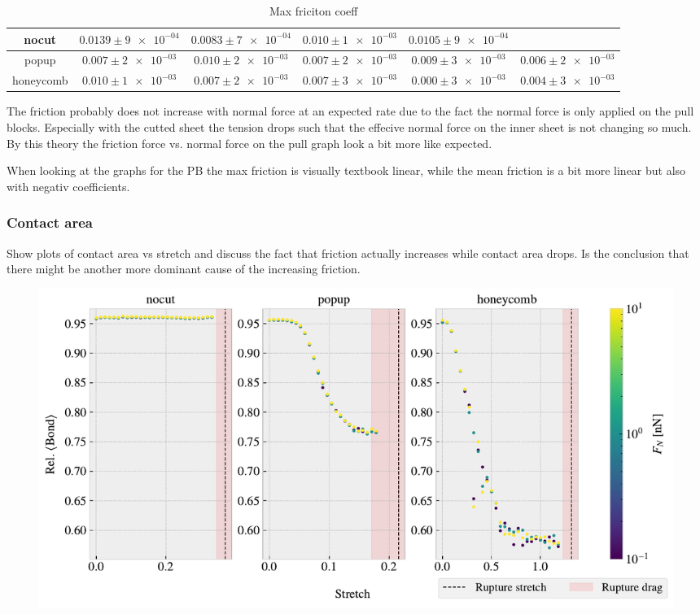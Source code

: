 \begin{table}[H]
  \begin{center}
  \caption{Max friciton coeff}
  \label{tab:fric_coeff}
  \begin{tabular}{| c | c | c | c | c | c |} \hline
    nocut & $0.0139 \pm \num{9e-04}$& $0.0083 \pm \num{7e-04}$& $0.010 \pm \num{1e-03}$& $0.0105 \pm \num{9e-04}$ &  \\ \hline
    popup & $0.007 \pm \num{2e-03}$& $0.010 \pm \num{2e-03}$& $0.007 \pm \num{2e-03}$& $0.009 \pm \num{3e-03}$& $0.006 \pm \num{2e-03}$ \\ \hline
    honeycomb & $0.010 \pm \num{1e-03}$& $0.007 \pm \num{2e-03}$& $0.007 \pm \num{3e-03}$& $0.000 \pm \num{3e-03}$& $0.004 \pm \num{3e-03}$ \\ \hline
  \end{tabular}
  \end{center}
\end{table}


The friction probably does not increase with normal force at an expected rate due to the fact the normal force is only applied on the pull blocks. Especially with the cutted sheet the tension drops such that the effecive normal force on the inner sheet is not changing so much. By this theory the friction force vs. normal force on the pull graph look a bit more like expected.

When looking at the graphs for the PB the max friction is visually textbook linear, while the mean friction is a bit more linear but also with negativ coefficients.

\subsubsection{Contact area}

Show plots of contact area vs stretch and discuss the fact that friction actually increases while contact area drops. Is the conclusion that there might be another more dominant cause of the increasing friction. 

\begin{figure}[H]
  \centering
  \includegraphics[width=\linewidth]{figures/baseline/multi_stretch_area_compare.pdf}
  \caption{}
  \label{fig:}
\end{figure}
